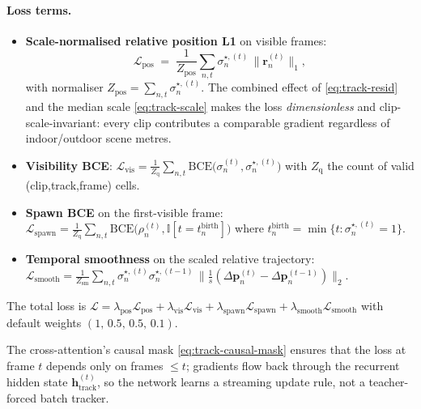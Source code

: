 \documentclass[11pt,a4paper]{article}
\begin{document}
\paragraph{Loss terms.}
\begin{itemize}
  \item \textbf{Scale-normalised relative position L1} on visible frames:
        \begin{equation}\label{eq:track-pos-loss}
          \mathcal{L}_{\text{pos}} \;=\;
          \frac{1}{Z_{\text{pos}}}
          \sum_{n,t} \sigma_n^{\star,(t)} \,\|\bm{r}_n^{(t)}\|_{1},
        \end{equation}
        with normaliser $Z_{\text{pos}} = \sum_{n,t}
        \sigma_n^{\star,(t)}$. The combined effect of
        \eqref{eq:track-resid} and the median scale
        \eqref{eq:track-scale} makes the loss \emph{dimensionless} and
        clip-scale-invariant: every clip contributes a comparable
        gradient regardless of indoor/outdoor scene metres.
  \item \textbf{Visibility BCE}:
        $\mathcal{L}_{\text{vis}} = \frac{1}{Z_{\text{q}}} \sum_{n,t}
        \mathrm{BCE}\bigl(\sigma_n^{(t)},\sigma_n^{\star,(t)}\bigr)$
        with $Z_{\text{q}}$ the count of valid (clip,track,frame) cells.
  \item \textbf{Spawn BCE} on the first-visible frame:
        $\mathcal{L}_{\text{spawn}} = \frac{1}{Z_{\text{q}}}
        \sum_{n,t} \mathrm{BCE}\bigl(\rho_n^{(t)},
        \mathbb{I}[t = t_n^{\text{birth}}]\bigr)$ where
        $t_n^{\text{birth}} = \min\{t : \sigma_n^{\star,(t)} = 1\}$.
  \item \textbf{Temporal smoothness} on the scaled relative trajectory:
        $\mathcal{L}_{\text{smooth}} = \frac{1}{Z_{\text{sm}}}
        \sum_{n,t}
        \sigma_n^{\star,(t)}\sigma_n^{\star,(t-1)}
        \,\|\tfrac{1}{s}(\Delta\bm{p}_n^{(t)} - \Delta\bm{p}_n^{(t-1)})\|_{2}$.
\end{itemize}
The total loss is
$\mathcal{L} = \lambda_{\text{pos}}\mathcal{L}_{\text{pos}}
            + \lambda_{\text{vis}}\mathcal{L}_{\text{vis}}
            + \lambda_{\text{spawn}}\mathcal{L}_{\text{spawn}}
            + \lambda_{\text{smooth}}\mathcal{L}_{\text{smooth}}$
with default weights $(1,\,0.5,\,0.5,\,0.1)$.

The cross-attention's causal mask \eqref{eq:track-causal-mask}
ensures that the loss at frame $t$ depends only on frames $\le t$;
gradients flow back through the recurrent hidden state
$\bm{h}^{(t)}_{\text{track}}$, so the network learns a streaming
update rule, not a teacher-forced batch tracker.
\end{document}
